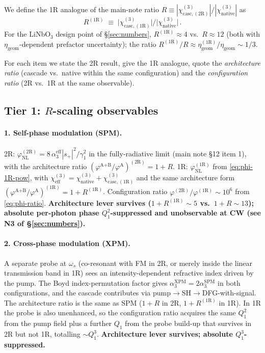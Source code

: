 \documentclass[11pt,a4paper]{article}
\newcommand{\chithree}{\chi^{(3)}}
\newcommand{\chicascOneR}{\chi^{(3)}_{\text{casc},(1\mathrm R)}}
\newcommand{\chicascTwoR}{\chi^{(3)}_{\text{casc},(2\mathrm R)}}
\begin{document}
We define the 1R analogue of the main-note ratio
$R\equiv|\chicascTwoR|/|\chithree_\text{native}|$ as
\begin{equation*}
  R^{(1\mathrm R)}\;\equiv\;\bigl|\chicascOneR\bigr|/\bigl|\chithree_\text{native}\bigr|\,.
\end{equation*}
For the LiNbO$_3$ design point of \S\ref{sec:numbers},
$R^{(1\mathrm R)}\!\approx\!4$ vs.\ $R\!\approx\!12$ (both with
$\eta_\text{geom}$-dependent prefactor uncertainty); the ratio
$R^{(1\mathrm R)}/R\approx\eta_\text{geom}^{(1\mathrm R)}/\eta_\text{geom}\sim 1/3$.

For each item we state the 2R result, give the 1R analogue, quote the
\emph{architecture ratio} (cascade vs.\ native within the same
configuration) and the \emph{configuration ratio} (2R vs.\ 1R at the
same observable).

\subsection*{Tier 1: \texorpdfstring{$R$}{R}-scaling observables}

\paragraph{1. Self-phase modulation (SPM).}
2R:
$\varphi_\text{NL}^{(2\mathrm R)}=8\,\alpha_3^\text{eff}|s_+|^{2}/\gamma_1^{2}$
in the fully-radiative limit (main note \S 12 item 1), with the
architecture ratio
$(\varphi^\text{A+B}/\varphi^\text{A})^{(2\mathrm R)}=1+R$.
1R: $\varphi_\text{NL}^{(1\mathrm R)}$ from \eqref{eq:phi-1R-pow}, with
$\chithree_\text{eff}=\chithree_\text{native}+\chicascOneR$ and the same
architecture form
$(\varphi^\text{A+B}/\varphi^\text{A})^{(1\mathrm R)}=1+R^{(1\mathrm R)}$.
Configuration ratio
$\varphi^{(2\mathrm R)}/\varphi^{(1\mathrm R)}\!\sim\!10^{6}$ from
\eqref{eq:phi-ratio}.
\textbf{Architecture lever survives ($1+R^{(1\mathrm R)}\!\sim\!5$ vs.\
$1+R\!\sim\!13$); absolute per-photon phase $Q_1^{2}$-suppressed and
unobservable at CW (see N3 of \S\ref{sec:numbers}).}

\paragraph{2. Cross-phase modulation (XPM).}
A separate probe at $\omega_s$ (co-resonant with FM in 2R, or merely
inside the linear transmission band in 1R) sees an intensity-dependent
refractive index driven by the pump.  The Boyd index-permutation factor
gives $\alpha_3^\text{XPM}=2\alpha_3^\text{SPM}$ in both configurations,
and the cascade contributes via pump$\to$SH$\to$DFG-with-signal.  The
architecture ratio is the same as SPM ($1+R$ in 2R, $1+R^{(1\mathrm R)}$
in 1R).  In 1R the probe is also unenhanced, so the configuration ratio
acquires the same $Q_1^{2}$ from the pump field plus a further $Q_1$
from the probe build-up that survives in 2R but not 1R, totalling
$\sim Q_1^{3}$.  \textbf{Architecture lever survives; absolute
$Q_1^{3}$-suppressed.}
\end{document}
